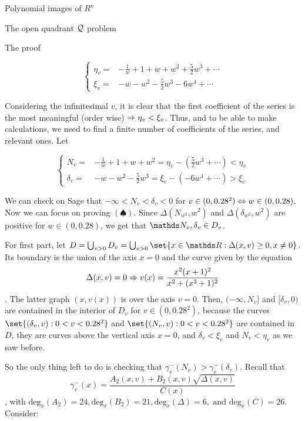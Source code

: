 \documentclass[11pt, a4paper, english, twoside, notitlepage]{report}
\begin{document}
\begin{chapter}{Polynomial images of $R^n$}
\begin{section}{The open quadrant $\mathcal{Q}$ problem}
\begin{subsection}{The proof}
\begin{Proof}
			\begin{equation*}\left\{
				\begin{split}
					\eta_v=&-\frac{1}{w}+1+w+w^2+\frac{5}{2}w^3+\cdots\\
					\xi_v=&-w-w^2-\frac{5}{2}w^3-6w^4+\cdots
				\end{split}\right.
			\end{equation*}
			
			Considering the infinitesimal $v$, it is clear that the first coefficient of the series is the most meaningful (order wise) $\Rightarrow \eta_v < \xi_v$. Thus, and to be able to make calculations, we need to find a finite number of coefficients of the series, and relevant ones. Let
			
			\begin{equation*}\left\{
				\begin{split}
					N_v=&-\frac{1}{w}+1+w+w^2=\eta_v-(\frac{5}{2}w^3+\cdots)<\eta_v\\
					\delta_v=&-w-w^2-\frac{5}{2}w^3=\xi_v-(-6w^4+\cdots)>\xi_v
				\end{split}\right.
			\end{equation*}
			
			We can check on Sage that $-\infty<N_v<\delta_v<0$ for $v \in (0, 0.28^2) \Leftrightarrow w \in (0, 0.28)$. Now we can focus on proving $(\spadesuit)$. Since $\Delta(N_{w^2}, w^2)$ and $\Delta(\delta_{w^2}, w^2)$ are positive for $w \in (0, 0.28)$, we get that $\N_v, \delta_v\in D_v$.
			
			For first part, let $D=\bigcup_{v>0} D_v=\bigcup_{v>0}\set{x\in \R: \Delta(x,v)\geq 0,x\neq 0}$. Its boundary is the union of the axis $x=0$ and the curve given by the equation 
			$$
			\Delta(x, v) = 0 \Rightarrow v(x)=\frac{x^2(x+1)^2}{x^2+(x^3+1)^2}
			$$
			. The latter graph $\left(x, v(x)\right)$ is over the axis $v = 0$. Then, $(-\infty, N_v]$ and $[\delta_v, 0)$ are contained in the interior of $D_v$ for $v\in (0, 0.28^2)$, because the curves $\set{(\delta_v, v): 0 < v < 0.28^2}$ and $\set{(N_v, v): 0 < v < 0.28^2}$ are contained in $D$, they are curves above the vertical axis $x = 0$, and $\delta_v < \xi_v$ and $N_v < \eta_v$ as we saw before. 
			
			So the only thing left to do is checking that $\gamma_v^-(N_v) > \gamma_v^-(\delta_v)$. Recall that 
			$$\gamma_v^-(x)=\dfrac{A_2(x,v)+B_2(x,v)\sqrt{\Delta(x,v)}}{C(x)}$$
			, with $\text{deg}_x(A_2) = 24, \text{deg}_x(B_2) = 21, \text{deg}_x(\Delta) = 6, \text{ and deg}_x(C) = 26$. Consider:
			

\end{Proof}
\end{subsection}
\end{section}
\end{chapter}
\end{document}

